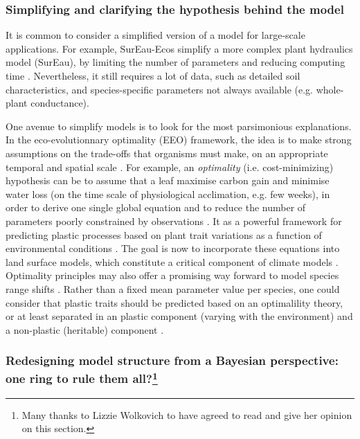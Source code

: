 \subsubsection{Simplifying and clarifying the hypothesis behind the model}

It is common to consider a simplified version of a model for large-scale applications. For example, SurEau-Ecos simplify a more complex plant hydraulics model (SurEau), by limiting the number of parameters and reducing computing time \citep{Ruffault2022}. Nevertheless, it still requires a lot of data, such as detailed soil characteristics, and species-specific parameters not always available (e.g. whole-plant conductance). 

One avenue to simplify models is to look for the most parsimonious explanations. In the eco-evolutionnary optimality (EEO) framework, the idea is to make strong assumptions on the trade-offs that organisms must make, on an appropriate temporal and spatial scale \citep{Franklin2020, Harrison2021}. 
For example, an \emph{optimality} (i.e. cost-minimizing) hypothesis can be to assume that a leaf maximise carbon gain and minimise water loss (on the time scale of physiological acclimation, e.g. few weeks), in order to derive one single global equation and to reduce the number of parameters poorly constrained by observations \citep{Wang2017, Harrison2021}. It as a powerful framework for predicting plastic processes based on plant trait variations as a function of environmental conditions \citep{Franklin2020}. The goal is now to incorporate these equations into land surface models, which constitute a critical component of climate models \citep{Franks2018}. Optimality principles may also offer a promising way forward to model species range shifts \citep{MartinezVilalta2023}.
Rather than a fixed mean parameter value per species, one could consider that plastic traits should be predicted based on an optimalility theory, or at least separated in an plastic component (varying with the environment) and a non-plastic (heritable) component \citep{Franklin2020}. 

\subsubsection[Redesigning model structure from a Bayesian perspective: one ring to rule them all?]{Redesigning model structure from a Bayesian perspective: one ring to rule them all?\footnote{Many thanks to Lizzie Wolkovich to have agreed to read and give her opinion on this section.}}

